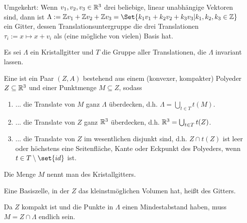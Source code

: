 \begin{example}
Umgekehrt: Wenn $v_1,v_2,v_3\in\mathbb{R}^3$ drei beliebige, linear unabhängige Vektoren sind, dann ist $\Lambda:=\IZ v_1+\IZ v_2 + \IZ v_3 = \Set{k_1 v_1+k_2 v_2+k_3 v_3 | k_1,k_2,k_3\in\IZ}$ ein Gitter, dessen Translationsuntergruppe die drei Translationen $\tau_i:=x\mapsto x+v_i$ als (eine mögliche von vielen) Basis hat.
\end{example}

\begin{definition}
Es sei $\Lambda$ ein Kristallgitter und $T$ die Gruppe aller Translationen, die $\Lambda$ invariant lassen.

Eine  ist ein Paar $(Z,A)$ bestehend aus einem (konvexer, kompakter) Polyeder $Z\subseteq\mathbb{R}^3$ und einer Punktmenge $M\subseteq Z$, sodass
\begin{enumerate}
\item ... die Translate von $M$ ganz $\Lambda$ überdecken, d.h. $\Lambda=\bigcup_{t\in T} t(M)$.
\item ... die Translate von $Z$ ganz $\mathbb{R}^3$ überdecken, d.h. $\mathbb{R}^3 = \bigcup_{t\in T} t(Z)$.
\item ... die Translate von $Z$ im wesentlichen disjunkt sind, d.h. $Z \cap t(Z)$ ist leer oder höchstens eine Seitenfläche, Kante oder Eckpunkt des Polyeders, wenn $t\in T\setminus\set{id}$ ist.
\end{enumerate}
Die Menge $M$ nennt man  des Kristallgitters.

Eine Basiszelle, in der $Z$ das kleinstmöglichen Volumen hat, heißt  des Gitters.
\end{definition}

\begin{remark}
Da $Z$ kompakt ist und die Punkte in $\Lambda$ einen Mindestabstand haben, muss $M=Z\cap\Lambda$ endlich sein.
\end{remark}
